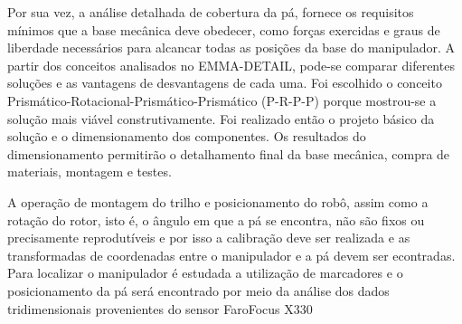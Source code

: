 Por sua vez, a análise detalhada de cobertura da pá, fornece os requisitos
mínimos que a base mecânica deve obedecer, como forças exercidas e graus de liberdade necessários
para alcancar todas as posições da base do manipulador. A partir dos conceitos
analisados no EMMA-DETAIL, pode-se comparar diferentes soluções e as vantagens
de desvantagens de cada uma. Foi escolhido o conceito
Prismático-Rotacional-Prismático-Prismático (P-R-P-P) porque mostrou-se a
solução mais viável construtivamente. Foi realizado então o projeto básico da
solução e o dimensionamento dos componentes. Os resultados do dimensionamento
permitirão o detalhamento final da base mecânica, compra de materiais, montagem
e testes.

A operação de montagem do trilho e posicionamento do robô, assim como
a rotação do rotor, isto é, o ângulo em que a pá se encontra, não são fixos ou
precisamente reprodutíveis e por isso a calibração deve ser realizada e as
transformadas de coordenadas entre o manipulador e a pá devem ser econtradas.
Para localizar o manipulador é estudada a utilização de marcadores e o
posicionamento da pá será encontrado por meio da análise dos dados
tridimensionais provenientes do sensor Faro\textregistered Focus X330